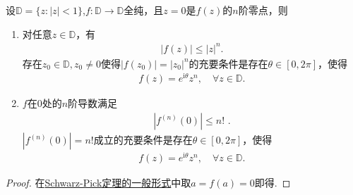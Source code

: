 \documentclass[../../main.tex]{subfiles}%
\begin{document}
\begin{theorem}[Schwarz定理的一般形式]\label{theorem:Schwarz定理的一般形式}
设$\mathbb{D} = \{z: |z| < 1\}$,$f: \mathbb{D} \to \mathbb{D}$全纯，且$z=0$是$f(z)$的$n$阶零点，则
\begin{enumerate}[(1)]
\item 对任意$z\in\mathbb{D}$，有
\begin{align*}
|f(z)| \leqslant |z|^n.
\end{align*}
存在$z_0\in\mathbb{D}, z_0\neq 0$使得$|f(z_0)|=|z_0|^n$的充要条件是存在$\theta\in[0,2\pi]$，使得
\begin{align*}
f(z) = e^{\mathrm{i}\theta} z^n,\quad \forall z\in\mathbb{D}.
\end{align*}

\item $f$在$0$处的$n$阶导数满足
\begin{align*}
|f^{(n)}(0)| \leqslant n!\,\,.
\end{align*}
$|f^{(n)}(0)|=n!$成立的充要条件是存在$\theta\in[0,2\pi]$，使得
\begin{align*}
f(z) = e^{\mathrm{i}\theta} z^n,\quad \forall z\in\mathbb{D}.
\end{align*}
\end{enumerate}
\end{theorem}
\begin{proof}

在\hyperref[theorem:Schwarz-Pick定理的一般形式]{Schwarz-Pick定理的一般形式}中取$a=f(a)=0$即得.

\end{proof}
\end{document}
